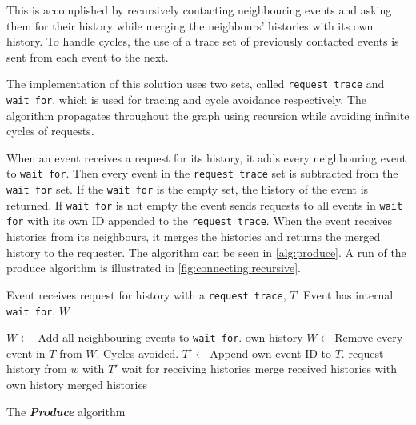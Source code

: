 	This is accomplished by recursively contacting neighbouring events and asking them for their history while merging the neighbours' histories with its own history. To handle cycles, the use of a trace set of previously contacted events is sent from each event to the next.
	
	\newpar The implementation of this solution uses two sets, called \texttt{request trace} and \texttt{wait for}, which is used for tracing and cycle avoidance respectively. The algorithm propagates throughout the graph using recursion while avoiding infinite cycles of requests. 
	
	When an event receives a request for its history, it adds every neighbouring event to \texttt{wait for}. Then every event in the \texttt{request trace} set is subtracted from the \texttt{wait for} set. If the \texttt{wait for} is the empty set, the history of the event is returned. If \texttt{wait for} is not empty the event sends requests to all events in \texttt{wait for} with its own ID appended to the \texttt{request trace}. When the event receives histories from its neighbours, it merges the histories and returns the merged history to the requester. The algorithm can be seen in \autoref{alg:produce}. A run of the produce algorithm is illustrated in \autoref{fig:connecting:recursive}.
	
	\begin{algorithm}
	\begin{algorithmic}
		\State Event receives request for history with a \texttt{request trace}, $T$.
		\State Event has internal \texttt{wait for}, $W$
		\State
		
			\State $W\gets$ \Comment Add all neighbouring events to \texttt{wait for}.
				\Return own history
			\Else
				\State $W\gets$\Comment Remove every event in $T$ from $W$. Cycles avoided.
				\State $T'\gets$\Comment Append own event ID to $T$.
				\State
					\State request history from $w$ with $T'$
				\EndFor
				\State wait for receiving histories
				\State merge received histories with own history
				\State
				\Return merged histories
			\EndIf
		\EndFunction
	\end{algorithmic}
	\caption{The \textit{\textbf{Produce}} algorithm}
	\label{alg:produce}
	\end{algorithm}
		
